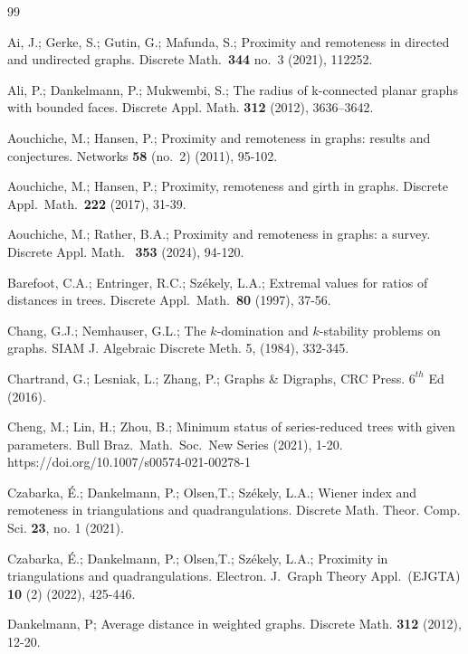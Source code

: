 \documentclass[a4paper,11pt]{article}
\numberwithin{equation}{theorem}
\begin{document}
\begin{thebibliography}{99}

 Ai, J.; Gerke, S.; Gutin, G.; Mafunda, S.; Proximity and remoteness in 
directed and undirected graphs. Discrete Math.\ {\bf 344} no.\ 3 (2021), 112252. 
     
 Ali, P.; Dankelmann, P.; Mukwembi, S.; The radius of k-connected planar graphs with bounded faces. Discrete Appl. Math. {\bf 312} (2012), 3636–3642.
    
 Aouchiche, M.; Hansen, P.; Proximity and remoteness in graphs: results and conjectures. Networks {\bf 58} (no.\ 2) (2011), 95-102.
     
 Aouchiche, M.; Hansen, P.; Proximity, remoteness and girth in graphs. Discrete Appl.\ Math.\ {\bf 222} (2017), 31-39. 
         
 Aouchiche, M.; Rather, B.A.; Proximity and remoteness in graphs: a survey. Discrete Appl. Math. \ {\bf 353} (2024), 94-120.

 Barefoot, C.A.; Entringer, R.C.; Sz\'{e}kely, L.A.; Extremal values for ratios of distances in trees. Discrete Appl.\ Math.\ {\bf 80} (1997), 37-56.

 Chang, G.J.; Nemhauser, G.L.; The $k$-domination and $k$-stability problems on graphs. SIAM J. Algebraic Discrete Meth. 5, (1984), 332-345.
   
 Chartrand, G.; Lesniak, L.; Zhang, P.; Graphs \& Digraphs, CRC Press. $6^{th}$ Ed (2016).
         
 Cheng, M.; Lin, H.; Zhou, B.;  Minimum status of series-reduced trees with given parameters. Bull Braz.\ Math.\ Soc.\, New Series (2021), 1-20. https://doi.org/10.1007/s00574-021-00278-1 

 
Czabarka, \'{E}.; Dankelmann, P.; Olsen,T.; Sz\'{e}kely, L.A.;  
Wiener index and remoteness in triangulations and quadrangulations. 
Discrete Math. Theor. Comp. Sci. {\bf 23}, no. 1 (2021). 
     
 Czabarka, \'{E}.; Dankelmann, P.; Olsen,T.; Sz\'{e}kely, L.A.; 
 Proximity in triangulations and quadrangulations. 
Electron. J.\ Graph Theory Appl.\ (EJGTA)  {\bf 10} (2) (2022), 425-446.
       
 Dankelmann, P; Average distance in weighted graphs. Discrete Math. {\bf 312} (2012), 12-20.
    

\end{thebibliography}
\end{document}
